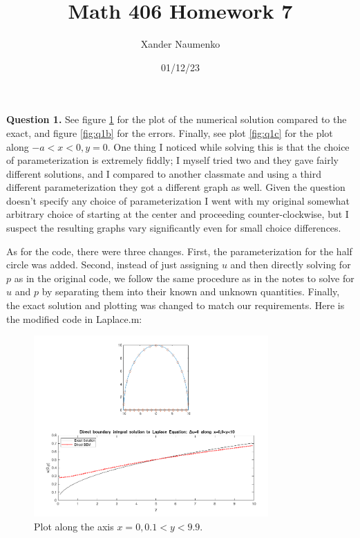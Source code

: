 \documentclass[letterpaper, reqno,11pt]{article}
\begin{document}
\title{Math 406 Homework 7}
\date{01/12/23}
\author{Xander Naumenko}
\maketitle

{\medskip\noindent\bf Question 1.} See figure \ref{fig:q1a} for the plot of the numerical solution compared to the exact, and figure \ref{fig:q1b} for the errors. Finally, see plot \ref{fig:q1c} for the plot along $-a<x<0,y=0$. One thing I noticed while solving this is that the choice of parameterization is extremely fiddly; I myself tried two and they gave fairly different solutions, and I compared to another classmate and using a third different parameterization they got a different graph as well. Given the question doesn't specify any choice of parameterization I went with my original somewhat arbitrary choice of starting at the center and proceeding counter-clockwise, but I suspect the resulting graphs vary significantly even for small choice differences.

As for the code, there were three changes. First, the parameterization for the half circle was added. Second, instead of just assigning $u$ and then directly solving for $p$ as in the original code, we follow the same procedure as in the notes to solve for $u$ and $p$ by separating them into their known and unknown quantities. Finally, the exact solution and plotting was changed to match our requirements. Here is the modified code in Laplace.m:

\begin{figure}[htpb]
    \centering
    \includegraphics[width=0.8\textwidth]{q1a}
    \caption{Plot along the axis $x=0,0.1<y<9.9$.}
    \label{fig:q1a}
\end{figure}
\end{document}
